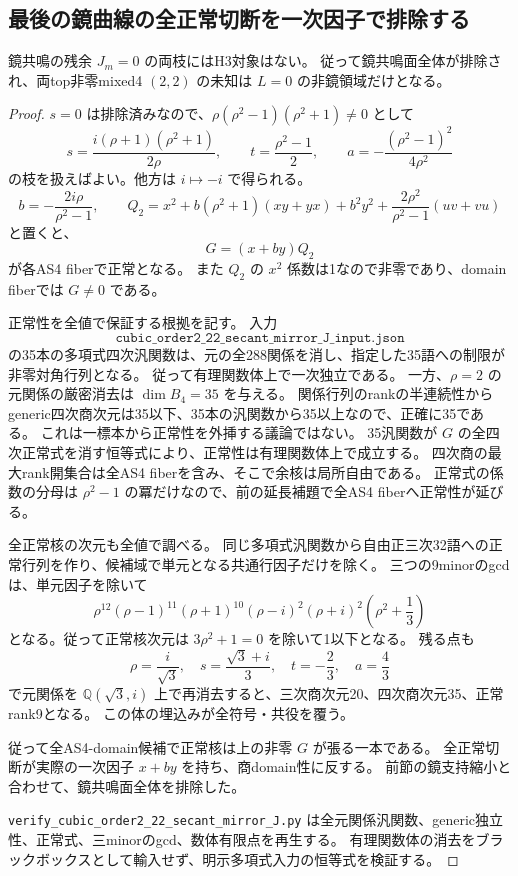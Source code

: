 \subsection{最後の鏡曲線の全正常切断を一次因子で排除する}
\begin{proposition}
鏡共鳴の残余 $J_m=0$ の両枝にはH3対象はない。
従って鏡共鳴面全体が排除され、両top非零mixed4 $(2,2)$ の未知は $L=0$ の非鏡領域だけとなる。
\end{proposition}
\begin{proof}
$s=0$ は排除済みなので、$\rho(\rho^2-1)(\rho^2+1)\ne0$ として
\[
 s=\frac{i(\rho+1)(\rho^2+1)}{2\rho},\qquad
 t=\frac{\rho^2-1}{2},\qquad
 a=-\frac{(\rho^2-1)^2}{4\rho^2}
\]
の枝を扱えばよい。他方は $i\mapsto-i$ で得られる。
\[
 b=-\frac{2i\rho}{\rho^2-1},\qquad
 Q_2=x^2+b(\rho^2+1)(xy+yx)+b^2y^2
       +\frac{2\rho^2}{\rho^2-1}(uv+vu)
\]
と置くと、
\[
 G=(x+by)Q_2
\]
が各AS4 fiberで正常となる。
また $Q_2$ の $x^2$ 係数は1なので非零であり、domain fiberでは $G\ne0$ である。

正常性を全値で保証する根拠を記す。
入力
\[
 \texttt{cubic\_order2\_22\_secant\_mirror\_J\_input.json}
\]
の35本の多項式四次汎関数は、元の全288関係を消し、指定した35語への制限が非零対角行列となる。
従って有理関数体上で一次独立である。
一方、$\rho=2$ の元関係の厳密消去は $\dim B_4=35$ を与える。
関係行列のrankの半連続性からgeneric四次商次元は35以下、35本の汎関数から35以上なので、正確に35である。
これは一標本から正常性を外挿する議論ではない。
35汎関数が $G$ の全四次正常式を消す恒等式により、正常性は有理関数体上で成立する。
四次商の最大rank開集合は全AS4 fiberを含み、そこで余核は局所自由である。
正常式の係数の分母は $\rho^2-1$ の冪だけなので、前の延長補題で全AS4 fiberへ正常性が延びる。

全正常核の次元も全値で調べる。
同じ多項式汎関数から自由正三次32語への正常行列を作り、候補域で単元となる共通行因子だけを除く。
三つの9minorのgcdは、単元因子を除いて
\[
 \rho^{12}(\rho-1)^{11}(\rho+1)^{10}
 (\rho-i)^2(\rho+i)^2\left(\rho^2+\frac13\right)
\]
となる。従って正常核次元は $3\rho^2+1=0$ を除いて1以下となる。
残る点も
\[
 \rho=\frac{i}{\sqrt3},\quad
 s=\frac{\sqrt3+i}{3},\quad t=-\frac23,\quad a=\frac43
\]
で元関係を $\mathbb Q(\sqrt3,i)$ 上で再消去すると、三次商次元20、四次商次元35、正常rank9となる。
この体の埋込みが全符号・共役を覆う。

従って全AS4-domain候補で正常核は上の非零 $G$ が張る一本である。
全正常切断が実際の一次因子 $x+by$ を持ち、商domain性に反する。
前節の鏡支持縮小と合わせて、鏡共鳴面全体を排除した。

\texttt{verify\_cubic\_order2\_22\_secant\_mirror\_J.py}
は全元関係汎関数、generic独立性、正常式、三minorのgcd、数体有限点を再生する。
有理関数体の消去をブラックボックスとして輸入せず、明示多項式入力の恒等式を検証する。
\end{proof}
